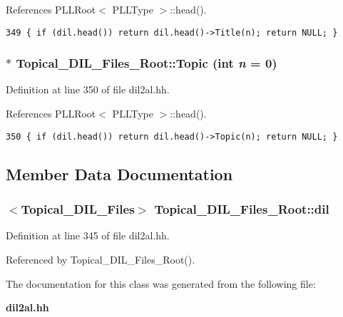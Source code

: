 References PLLRoot$<$ PLLType $>$::head().



\footnotesize\begin{verbatim}349 { if (dil.head()) return dil.head()->Title(n); return NULL; }
\end{verbatim}\normalsize 
{}
\subsubsection{$\ast$ Topical\_\-DIL\_\-Files\_\-Root::Topic (int {\em n} = 0)\hspace{0.3cm}{\tt  [inline]}}\label{classTopical__DIL__Files__Root_a4}




Definition at line 350 of file dil2al.hh.

References PLLRoot$<$ PLLType $>$::head().



\footnotesize\begin{verbatim}350 { if (dil.head()) return dil.head()->Topic(n); return NULL; }
\end{verbatim}\normalsize 


\subsection{Member Data Documentation}
\subsubsection{$<${\bf Topical\_\-DIL\_\-Files}$>$ Topical\_\-DIL\_\-Files\_\-Root::dil}\label{classTopical__DIL__Files__Root_m0}




Definition at line 345 of file dil2al.hh.

Referenced by Topical\_\-DIL\_\-Files\_\-Root().

The documentation for this class was generated from the following file:\begin{CompactItemize}
\item 
{\bf dil2al.hh}\end{CompactItemize}
